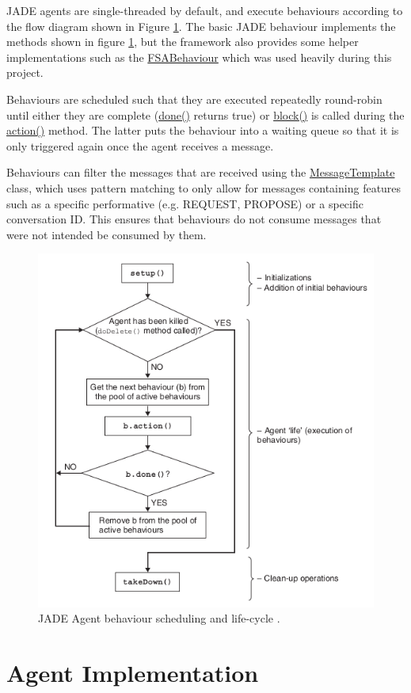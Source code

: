 \documentclass{article}
\begin{document}
JADE agents are single-threaded by default, and execute behaviours according to the flow diagram shown in Figure \ref{fig:behaviour}. The basic JADE behaviour implements the methods shown in figure \ref{fig:behaviour}, but the framework also provides some helper implementations such as the \url{FSABehaviour} which was used heavily during this project. 

Behaviours are scheduled such that they are executed repeatedly round-robin until either they are complete (\url{done()} returns true) or \url{block()} is called during the \url{action()} method. The latter puts the behaviour into a waiting queue so that it is only triggered again once the agent receives a message. 

Behaviours can filter the messages that are received using the \url{MessageTemplate} class, which uses pattern matching to only allow for messages containing features such as a specific performative (e.g. REQUEST, PROPOSE) or a specific conversation ID. This ensures that behaviours do not consume messages that were not intended be consumed by them. 

\begin{figure}[!ht]
	\centering
	\includegraphics[width=0.8\linewidth]{images/behaviour}
	\caption{JADE Agent behaviour scheduling and life-cycle \cite{jade}.}
	\label{fig:behaviour}
\end{figure}

\section{Agent Implementation} \label{sec:agentimpl}
\end{document}
